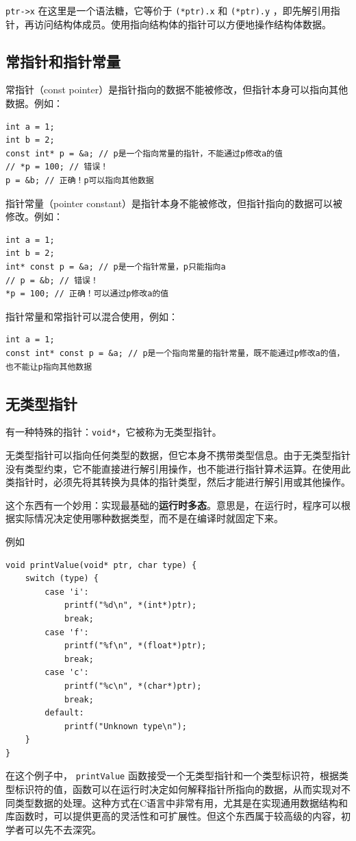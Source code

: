 \verb|ptr->x| 在这里是一个语法糖，它等价于 \verb|(*ptr).x| 和 \verb|(*ptr).y| ，即先解引用指针，再访问结构体成员。使用指向结构体的指针可以方便地操作结构体数据。

\subsection{常指针和指针常量}

常指针（const pointer）是指针指向的数据不能被修改，但指针本身可以指向其他数据。例如：
\begin{verbatim}
int a = 1;
int b = 2;
const int* p = &a; // p是一个指向常量的指针，不能通过p修改a的值
// *p = 100; // 错误！
p = &b; // 正确！p可以指向其他数据
\end{verbatim}    

指针常量（pointer constant）是指针本身不能被修改，但指针指向的数据可以被修改。例如：
\begin{verbatim}
int a = 1;
int b = 2;
int* const p = &a; // p是一个指针常量，p只能指向a
// p = &b; // 错误！
*p = 100; // 正确！可以通过p修改a的值
\end{verbatim}

指针常量和常指针可以混合使用，例如：
\begin{verbatim}
int a = 1;
const int* const p = &a; // p是一个指向常量的指针常量，既不能通过p修改a的值，也不能让p指向其他数据
\end{verbatim}

\subsection{无类型指针}

有一种特殊的指针：\texttt{void*}，它被称为无类型指针。

无类型指针可以指向任何类型的数据，但它本身不携带类型信息。由于无类型指针没有类型约束，它不能直接进行解引用操作，也不能进行指针算术运算。在使用此类指针时，必须先将其转换为具体的指针类型，然后才能进行解引用或其他操作。

这个东西有一个妙用：实现最基础的\textbf{运行时多态}。意思是，在运行时，程序可以根据实际情况决定使用哪种数据类型，而不是在编译时就固定下来。

例如
\begin{verbatim}
void printValue(void* ptr, char type) {
    switch (type) {
        case 'i':
            printf("%d\n", *(int*)ptr);
            break;
        case 'f':
            printf("%f\n", *(float*)ptr);
            break;
        case 'c':
            printf("%c\n", *(char*)ptr);
            break;
        default:
            printf("Unknown type\n");
    }
}
\end{verbatim}
在这个例子中， \verb|printValue| 函数接受一个无类型指针和一个类型标识符，根据类型标识符的值，函数可以在运行时决定如何解释指针所指向的数据，从而实现对不同类型数据的处理。这种方式在C语言中非常有用，尤其是在实现通用数据结构和库函数时，可以提供更高的灵活性和可扩展性。但这个东西属于较高级的内容，初学者可以先不去深究。

